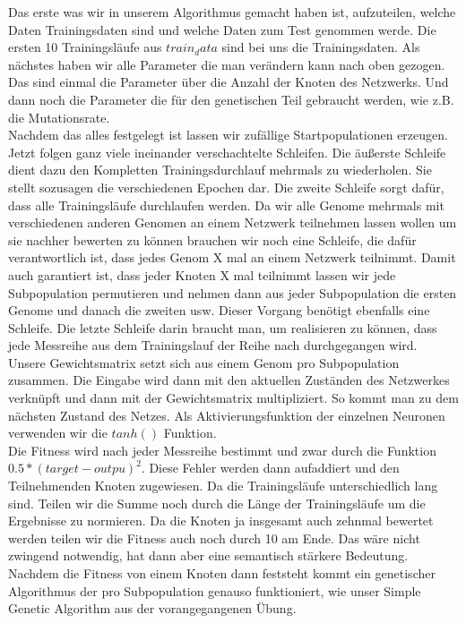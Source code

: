 \documentclass{hbrs-ecta-report}
\begin{document}
 Das erste was wir in unserem Algorithmus gemacht haben ist, aufzuteilen, welche Daten Trainingsdaten sind und welche Daten zum Test genommen werde. Die ersten 10 Trainingsläufe aus $train_data$ sind bei uns die Trainingsdaten. 
Als nächstes haben wir alle Parameter die man verändern kann nach oben gezogen. Das sind einmal die Parameter über die Anzahl der Knoten des Netzwerks. Und dann noch die Parameter die für den genetischen Teil gebraucht werden, wie z.B. die Mutationsrate.\\
Nachdem das alles festgelegt ist lassen wir zufällige Startpopulationen erzeugen. Jetzt folgen ganz viele ineinander verschachtelte Schleifen. 
Die äußerste Schleife dient dazu den Kompletten Trainingsdurchlauf mehrmals zu wiederholen. Sie stellt sozusagen die verschiedenen Epochen dar. Die zweite Schleife sorgt dafür, dass alle Trainingsläufe durchlaufen werden.
Da wir alle Genome mehrmals mit verschiedenen anderen Genomen an einem Netzwerk teilnehmen lassen wollen um sie nachher bewerten zu können brauchen wir noch eine Schleife, die dafür verantwortlich ist, dass jedes Genom X mal an einem Netzwerk teilnimmt. Damit auch garantiert ist, dass jeder Knoten X mal teilnimmt lassen wir jede Subpopulation permutieren und nehmen dann aus jeder Subpopulation die ersten Genome und danach die zweiten usw. Dieser Vorgang benötigt ebenfalls eine Schleife. Die letzte Schleife darin braucht man, um realisieren zu können, dass jede Messreihe aus dem Trainingslauf der Reihe nach durchgegangen wird.\\
Unsere Gewichtsmatrix setzt sich aus einem Genom pro Subpopulation zusammen. Die Eingabe wird dann mit den aktuellen Zuständen des Netzwerkes verknüpft und dann mit der Gewichtsmatrix multipliziert. So kommt man zu dem nächsten Zustand des Netzes. Als Aktivierungsfunktion der einzelnen Neuronen verwenden wir die $tanh()$ Funktion.  \\
Die Fitness wird nach jeder Messreihe bestimmt und zwar durch die Funktion $ 0.5 * (target-outpu)^2 $. Diese Fehler werden dann aufaddiert und den Teilnehmenden Knoten zugewiesen. Da die Trainingsläufe unterschiedlich lang sind. Teilen wir die Summe noch durch die Länge der Trainingsläufe um die Ergebnisse zu normieren. Da die Knoten ja insgesamt auch zehnmal bewertet werden teilen wir die Fitness auch noch durch 10 am Ende. Das wäre nicht zwingend notwendig, hat dann aber eine semantisch stärkere Bedeutung. 
Nachdem die Fitness von einem Knoten dann feststeht kommt ein genetischer Algorithmus der pro Subpopulation genauso funktioniert, wie unser Simple Genetic Algorithm aus der vorangegangenen Übung.
\end{document}
